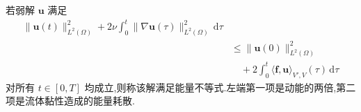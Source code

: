 \begin{definition}[能量不等式]\label{def:time-dependent-energy-inequality}
若弱解 $\bm{u}$ 满足
\begin{equation}\label{eq:time-dependent-energy-inequality}
\begin{aligned}
  \|\bm{u}(t)\|_{L^2(\Omega)}^2
  +2\nu\int_0^t\|\nabla\bm{u}(\tau)\|_{L^2(\Omega)}^2\,\mathrm{d}\tau\\
  &\le \|\bm{u}(0)\|_{L^2(\Omega)}^2\\
  &\quad+2\int_0^t\langle\bm{f},\bm{u}\rangle_{V',V}(\tau)\,\mathrm{d}\tau
\end{aligned}
\end{equation}
对所有 $t\in[0,T]$ 均成立,则称该解满足能量不等式.左端第一项是动能的两倍,第二项是流体黏性造成的能量耗散.
\end{definition}

